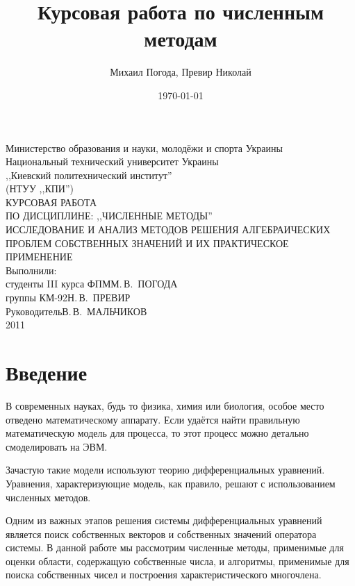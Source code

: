 \documentclass[a4paper,12pt,notitlepage,pdftex,headsepline]{scrartcl}
\author{Михаил Погода, Превир Николай}
\title{Курсовая работа по численным методам}
\date{\today}
\begin{document}
\thispagestyle{empty}
\begin{center}
Министерство образования и науки, молодёжи и спорта Украины\\
Национальный технический университет Украины\\
,,Киевский политехнический институт''\\
(НТУУ ,,КПИ'')\\
\vspace*{4cm}
\MakeUppercase{Курсовая работа}\\
\MakeUppercase{по дисциплине: ,,Численные методы''}\\
\MakeUppercase{Исследование и анализ методов решения алгебраических}\\
\MakeUppercase{проблем собственных значений и их практическое применение}\\
\vspace*{3cm}
Выполнили:\hfill~\\
студенты III курса ФПМ\hfill М.\,В.~ПОГОДА\\
группы КМ-92\hfill 		     Н.\,В.~ПРЕВИР\\
\vspace{2cm}
Руководитель\hfill В.\,В.~МАЛЬЧИКОВ\\
\vspace*{5cm}
2011
\end{center}
\newpage
\tableofcontents
\newpage

\section*{Введение}
В современных науках, будь то физика, химия или биология, особое место отведено математическому аппарату.
Если удаётся найти правильную математическую модель для процесса, то этот процесс можно детально смоделировать на ЭВМ.

Зачастую такие модели используют теорию дифференциальных уравнений.
Уравнения, характеризующие модель, как правило, решают с использованием численных методов.

Одним из важных этапов решения системы дифференциальных уравнений является поиск собственных векторов и собственных значений оператора системы.
В данной работе мы рассмотрим численные методы, применимые для оценки области, содержащую собственные числа, и алгоритмы, применимые для поиска собственных чисел и построения характеристического многочлена.
\newpage
\end{document}
